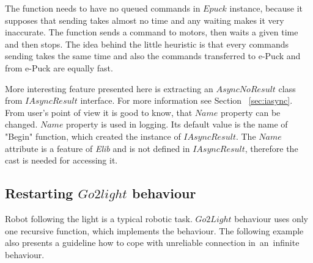   The function needs to have no queued commands in $Epuck$ instance, 
  because it supposes that sending takes almost no time and any waiting makes it very inaccurate.
  The function sends a command to motors, then waits a given time and then stops.
  The idea behind the little heuristic is that every commands sending takes the 
  same time and also the commands transferred to e-Puck and from e-Puck are equally fast.

  More interesting feature presented here is extracting 
  an $AsyncNoResult$ class from $IAsyncResult$ interface. 
  For more information see Section ~\ref{sec:iasync}.
  From user's point of view it is good to know, that $Name$ property can be changed. 
  $Name$ property is used in logging. 
  Its default value is the name of "Begin" function,
  which created the instance of $IAsyncResult$. The $Name$ attribute is a feature of {\it Elib} 
  and is not defined in $IAsyncResult$, therefore the cast is needed for accessing it.

\subsection{Restarting $Go2light$ behaviour}\label{sec:go2light}
  Robot following the light is a typical robotic task. $Go2Light$ behaviour uses only one recursive function, which implements the behaviour.
  The following example also presents a guideline how to cope with unreliable connection 
  in~an~infinite behaviour.

